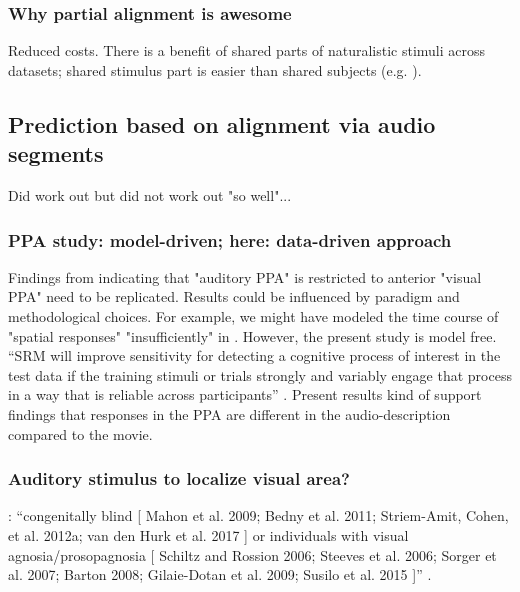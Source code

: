 \subsubsection{Why partial alignment is awesome}



%
Reduced costs.
%
There is a benefit of shared parts of naturalistic stimuli across datasets;
shared stimulus part is easier than shared subjects (e.g.
\citep{zhang2018transfer}).



\subsection{Prediction based on alignment via audio segments}

Did work out but did not work out "so well"...


\subsubsection{PPA study: model-driven; here: data-driven approach}
%
Findings from \citep{haeusler2022processing} indicating that "auditory PPA" is
restricted to anterior "visual PPA" need to be replicated.
%
Results could be influenced by paradigm and methodological choices.
%
For example, we might have modeled the time course of "spatial responses"
"insufficiently" in \citep{haeusler2022processing}.
%
However, the present study is model free.
%
``SRM will improve sensitivity for detecting a cognitive process of interest in
the test data if the training stimuli or trials strongly and variably engage
that process in a way that is reliable across participants''
\citep{cohen2017computational}.
%
Present results kind of support findings that responses in the PPA are different
in the audio-description compared to the movie.


\subsubsection{Auditory stimulus to localize visual area?}


%
\citep{rosenke2021probabilistic}:
``congenitally blind [
    Mahon et al. 2009;
    Bedny et al. 2011;
    Striem-Amit, Cohen, et al. 2012a;
    van den Hurk et al. 2017
] or individuals with
%
visual agnosia/prosopagnosia [
    Schiltz and Rossion 2006;
    Steeves et al. 2006;
    Sorger et al. 2007;
    Barton 2008;
    Gilaie-Dotan et al. 2009;
    Susilo et al. 2015
]'' \citep{rosenke2021probabilistic}.




